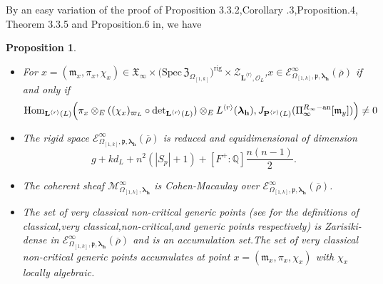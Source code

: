 \documentclass[SecEq,CM,GP]{degruyter-crelle} %
\theoremstyle{plain}
\newtheorem{pro}[thm]{Proposition}
\newcommand{\ana}{{\rm an}}
\newcommand{\gal}{{\rm Gal}}
\newcommand{\homo}{{\rm Hom}}
\newcommand{\lrr}{{\langle r\rangle}}
\newcommand{\omepik}{\Omega_{[1,k]}}
\newcommand{\rig}{{\rm rig}}
\newcommand{\rec}{{\rm rec}_L}
\newcommand{\rigch}{{\mathcal{Z}_{\bL^{\lrr},\mathcal{O}_L}}}
\newcommand{\Spf}{{\mathrm{Spf}}}
\newcommand{\sbanpik}{{\big(\mathrm{Spec}\hspace{2pt}\mathfrak{Z}_{\omepik}\big)^{\mathrm{rig}}}}
\newcommand{\BQ}{{\mathbb{Q}}}
\newcommand{\BU}{{\mathbb{U}}}
\newcommand{\bL}{{\mathbf{L}}}
\newcommand{\bP}{{\mathbf{P}}}
\newcommand{\bh}{{\mathbf{h}}}
\newcommand{\cM}{\mathcal M}
\newcommand{\FX}{{\mathfrak{X}}}
\newcommand{\fm}{{\mathfrak{m}}}
\newcommand{\fp}{{\mathfrak{p}}}
\begin{document}
By an easy variation of the proof of Proposition  3.3.2,\;Corollary .3,\;Proposition.4, Theorem 3.3.5 and Proposition.6 in\cite{Ding2021}, we have
\begin{pro}\label{basicpropertyeigen}\hspace{20pt}
\begin{itemize}
	\item[(1)]  For $x=(\fm_x, \pi_{x},\chi_x)\in \FX_{\infty}\times\sbanpik\times \rigch$,\;$x\in \mathcal{E}_{\omepik,\fp,{\bm\lambda}_\bh}^\infty(\overline{\rho})$ if and only if
	\[\homo_{\bL^{\lrr}(L)}\Big(\pi_{x}\otimes_E((\chi_x)_{\varpi_{L}}\circ\mathrm{ det}_{\bL^{\lrr}(L)})\otimes_E L^{\lrr}({\bm\lambda}_\bh),J_{\bP^{\lrr}(L)}(\Pi_\infty^{R_\infty-\ana}[\fm_y] )\Big)\neq0\]
	\item[(2)] The rigid space $\mathcal{E}_{\omepik,\fp,{\bm\lambda}_\bh}^\infty(\overline{\rho})$ is reduced and equidimensional of dimension
	\[g+kd_L+n^2(|S_p|+1)+[F^+:\BQ]\frac{n(n-1)}{2}.\]
	\item[(3)] The coherent sheaf $\cM_{\omepik,{\bm\lambda}_\bh}^{\infty}$ is Cohen-Macaulay over $\mathcal{E}_{\omepik,\fp,{\bm\lambda}_\bh}^\infty(\overline{\rho})$.\;
	\item[(4)] The set of very classical non-critical generic points  (see \cite[Defintion 3.2.7,\;(3.22)]{Ding2021} for the definitions of classical,\;very classical,\;non-critical,\;and generic points respectively) is Zarisiki-dense in $\mathcal{E}_{\omepik,\fp,{\bm\lambda}_\bh}^\infty(\overline{\rho})$ and is an accumulation set.\;The set of very classical non-critical generic points  accumulates at point $x=(\fm_x, \pi_{x},\chi_x)$ with $\chi_x$ locally algebraic.\;
\end{itemize}
\end{pro}
\end{document}
